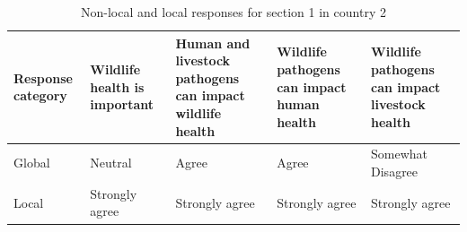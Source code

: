 \documentclass[
  letterpaper,
  DIV=11,
  numbers=noendperiod]{scrartcl}
\begin{document}
\begin{table}[H]

\caption{Non-local and local responses for section 1 in country 2}
\centering
\begin{tabular}[t]{>{\raggedright\arraybackslash}p{2cm}|>{\raggedright\arraybackslash}p{3cm}|>{\raggedright\arraybackslash}p{3cm}|>{\raggedright\arraybackslash}p{3cm}|>{\raggedright\arraybackslash}p{3cm}}
\hline
Response
category & Wildlife health
is important & Human and livestock
pathogens can
impact wildlife
health & Wildlife pathogens can
impact human health & Wildlife pathogens can
impact livestock health\\
\hline
Global & Neutral & Agree & Agree & Somewhat Disagree\\
\hline
Local & Strongly agree & Strongly agree & Strongly agree & Strongly agree\\
\hline
\end{tabular}
\end{table}
\end{document}
